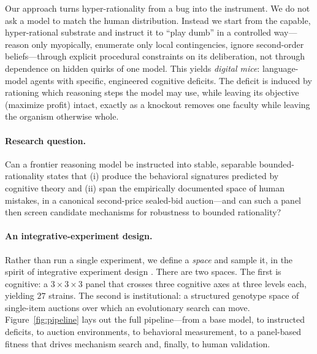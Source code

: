 \documentclass[12pt]{article}
\begin{document}
Our approach turns hyper-rationality from a bug into the instrument. We do not ask
a model to match the human distribution. Instead we start from the capable,
hyper-rational substrate and instruct it to ``play dumb'' in a controlled
way---reason only myopically, enumerate only local contingencies, ignore
second-order beliefs---through explicit procedural constraints on its
deliberation, not through dependence on hidden quirks of one model. This yields
\emph{digital mice}: language-model agents with specific, engineered cognitive
deficits. The deficit is induced by rationing which reasoning steps the model may
use, while leaving its objective (maximize profit) intact, exactly as a knockout
removes one faculty while leaving the organism otherwise whole.

\paragraph{Research question.} Can a frontier reasoning model be instructed into
stable, separable bounded-rationality states that (i) produce the behavioral
signatures predicted by cognitive theory and (ii) span the empirically documented
space of human mistakes, in a canonical second-price sealed-bid auction---and can
such a panel then screen candidate mechanisms for robustness to bounded
rationality?

\paragraph{An integrative-experiment design.} Rather than run a single experiment,
we define a \emph{space} and sample it, in the spirit of integrative experiment
design \citep{almaatouq2024,alsobay2025integrative}. There are two spaces. The
first is cognitive: a $3\times3\times3$ panel that crosses three cognitive axes at
three levels each, yielding $27$ strains. The second is institutional: a
structured genotype space of single-item auctions over which an evolutionary
search can move. Figure~\ref{fig:pipeline} lays out the full pipeline---from a
base model, to instructed deficits, to auction environments, to behavioral
measurement, to a panel-based fitness that drives mechanism search and, finally,
to human validation.
\end{document}
